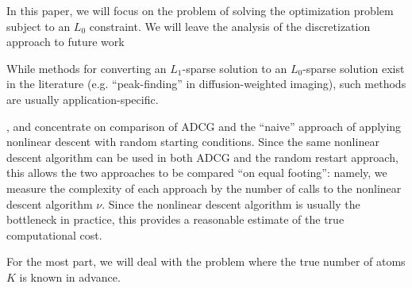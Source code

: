 \documentclass[11pt]{article}
\begin{document}
In this paper, we will focus on the problem of solving the
optimization problem subject to an $L_0$ constraint.  We will leave
the analysis of the discretization approach to future
work\begin{footnote}{While methods for converting an $L_1$-sparse
  solution to an $L_0$-sparse solution exist in the literature
  (e.g. ``peak-finding'' in diffusion-weighted imaging), such methods
  are usually application-specific.}\end{footnote}, and concentrate on
comparison of ADCG and the ``naive'' approach of applying nonlinear
descent with random starting conditions.  Since the same nonlinear
descent algorithm can be used in both ADCG and the random restart
approach, this allows the two approaches to be compared ``on equal
footing'': namely, we measure the complexity of each approach by the
number of calls to the nonlinear descent algorithm $\nu$.  Since the
nonlinear descent algorithm is usually the bottleneck in practice,
this provides a reasonable estimate of the true computational cost.

For the most part, we will deal with the problem where the true number
of atoms $K$ is known in advance.
\end{document}
